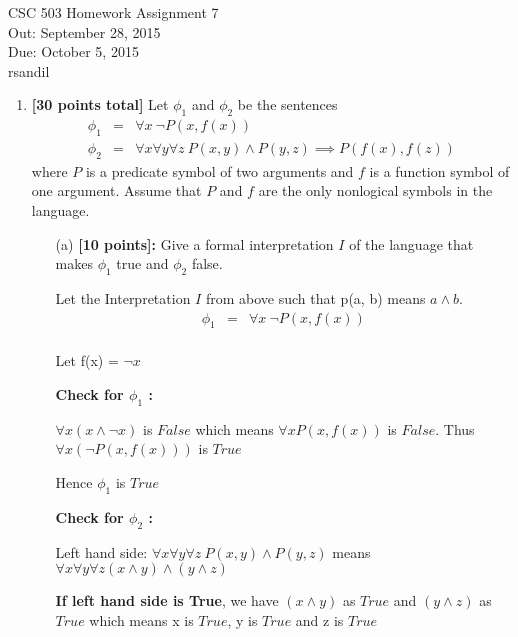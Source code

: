 \documentclass{article}
\def\unityid{rsandil}
\begin{document}
\begin{center}
  {\LARGE CSC 503 Homework Assignment 7}\\[1pc]
  Out: September 28, 2015 \\
  Due: October 5, 2015 \\
  \unityid
\end{center}

\begin{enumerate}

\item \textbf{[30 points total]} Let $\phi_1$ and $\phi_2$ be the
  sentences
  \begin{eqnarray*}
    \phi_1 
    & =
    & \forall x \ \neg P(x,f(x)) \\
    \phi_2
    & = 
    & \forall x \forall y \forall z \ 
      P(x,y) \land P(y,z) \implies P(f(x),f(z))
  \end{eqnarray*}
  where $P$ is a predicate symbol of two arguments and $f$ is a
  function symbol of one argument.  Assume that $P$ and $f$ are the
  only nonlogical symbols in the language.

  \begin{itemize}

  \item[(a)] \textbf{[10 points]:} Give a formal interpretation $I$ of
    the language that makes $\phi_1$ true and $\phi_2$ false.
    
\begin{answer}
       Let the Interpretation $I$ from above such that p(a, b) means $ a \land b$.
       \begin{eqnarray*}
    \phi_1 
    & =
    & \forall x \ \neg P(x,f(x)) \\
    \end {eqnarray*}
       
     Let f(x) = $\neg x$
    
    \textbf{Check for $\phi_1$ :}
    
    $\forall x( x \land \neg x)$ is $False$ which means $\forall x P(x,f(x))$ is $False$. Thus $\forall x (\neg P(x,f(x)))$ is $True$
    
    Hence $\phi_1$ is \textbf{$True$}
    
   \textbf{Check for $\phi_2$ :}
    
   Left hand side: $ \forall x \forall y \forall z \ P(x,y) \land P(y,z) $ means $\forall x \forall y \forall z  (x \land y) \land (y \land z)$ 
    
    \textbf{If left hand side is True}, we have $(x \land y)$ as $True$ and $(y \land z)$ as $True$ which means x is $True$, y is $True$ and z is $True$
   

\end{answer}
\end{itemize}
\end{enumerate}
\end{document}
